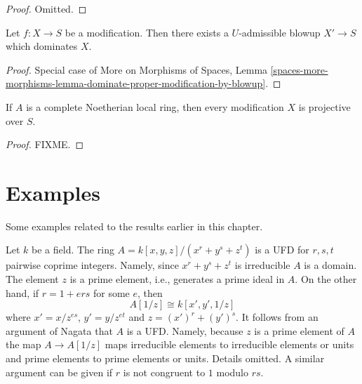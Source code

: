 \begin{proof}
Omitted.
\end{proof}

\begin{lemma}
\label{lemma-dominate-by-admissible-blowup}
Let $f : X \to S$ be a modification. Then there exists a $U$-admissible
blowup $X' \to S$ which dominates $X$.
\end{lemma}

\begin{proof}
Special case of More on Morphisms of Spaces,
Lemma \ref{spaces-more-morphisms-lemma-dominate-proper-modification-by-blowup}.
\end{proof}

\begin{lemma}
\label{lemma-projective-over-complete}
If $A$ is a complete Noetherian local ring, then every modification
$X$ is projective over $S$.
\end{lemma}

\begin{proof}
FIXME.
\end{proof}






\section{Examples}
\label{section-examples}

\noindent
Some examples related to the results earlier in this chapter.

\begin{example}
\label{example-factorial}
\begin{reference}
\cite[4(c)]{Samuel-UFD}
\end{reference}
Let $k$ be a field. The ring $A = k[x, y, z]/(x^r + y^s + z^t)$
is a UFD for $r, s, t$ pairwise coprime integers. Namely, since
$x^r + y^s + z^t$ is irreducible $A$ is a domain. The element $z$
is a prime element, i.e., generates a prime ideal in $A$.
On the other hand, if $r = 1 + ers$ for some $e$, then
$$
A[1/z] \cong k[x', y', 1/z]
$$
where $x' = x/z^{es}$, $y' = y/z^{et}$ and $z = (x')^r + (y')^s$.
It follows from an argument of Nagata that $A$ is a UFD. Namely,
because $z$ is a prime element of $A$ the map $A \to A[1/z]$ maps
irreducible elements to irreducible elements or units and prime elements
to prime elements or units. Details omitted.
A similar argument can be given if $r$ is not congruent to $1$
modulo $rs$.
\end{example}


